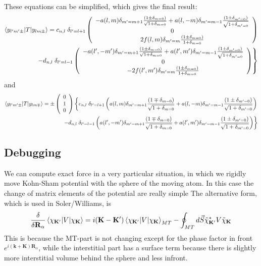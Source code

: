 \documentclass[aps,prb,floatfix,epsfig,singlecolumn,showpacs,preprintnumbers]{revtex4}
\newcommand{\vR}{{\mathbf{R}}}
\newcommand{\vk}{{\mathbf{k}}}
\newcommand{\vK}{{\mathbf{K}}}
\begin{document}
These equations can be simplified, which gives the final result:
\begin{eqnarray}
\braket{y_{l'm'\pm}|T|y_{lm\pm}}  =
c_{n,l}\;\delta_{l'=l+1}
\left(
\begin{array}{c}
-a(l,m)\delta_{m'=m+1}\frac{(1\pm\delta_{m=0})}{\sqrt{1+\delta_{m=0}}}
+a(l,-m)\delta_{m'=m-1}\frac{(1\pm\delta_{m'=0})}{\sqrt{1+\delta_{m'=0}}} \\
0\\
2 f(l,m)\delta_{m'=m} \frac{(1\pm\delta_{m=0})}{1+\delta_{m=0}}
\end{array}
\right)
%
\nonumber\\
\left.
%
-d_{n,l}\;\delta_{l'=l-1}
\left(
\begin{array}{c}
-a(l',-m')\delta_{m'=m+1}\frac{(1\pm\delta_{m=0})}{\sqrt{1+\delta_{m=0}}}+a(l',m')\delta_{m'=m-1}\frac{(1\pm\delta_{m'=0})}{\sqrt{1+\delta_{m'=0}}}\\
0\\
-2 f(l',m')\delta_{m'=m}\frac{(1\pm\delta_{m=0})}{1+\delta_{m=0}}
\end{array}
\right)
\right\}
\end{eqnarray}
and
\begin{eqnarray}
\braket{y_{l'm'\pm}|T|y_{lm\mp}}  =
\pm\left(
\begin{array}{c}
0\\
1\\
0
\end{array}
\right)
\left\{
c_{n,l}\;\delta_{l'=l+1}
\left(
  a(l,m)\delta_{m'=m+1}\frac{(1\mp\delta_{m=0})}{\sqrt{1+\delta_{m=0}}}+a(l,-m)\delta_{m'=m-1}\frac{(1\pm\delta_{m'=0})}{\sqrt{1+\delta_{m'=0}}}
\right)
\right.
%
\nonumber\\
%
\left.
-d_{n,l}\;\delta_{l'=l-1}
\left(
a(l',-m')\delta_{m'=m+1}\frac{(1\mp\delta_{m=0})}{\sqrt{1+\delta_{m=0}}}+a(l',m')\delta_{m'=m-1}\frac{(1\pm\delta_{m'=0})}{\sqrt{1+\delta_{m'=0}}}
\right)
\right\}
\end{eqnarray}

\subsection{Debugging}

We can compute exact force in a very particular situation, in which we
rigidly move Kohn-Sham potential with the sphere of the moving
atom. In this case the change of matrix elements of the potential are
really simple
The alternative form, which is used in Soler/Williams, is
\begin{eqnarray}
\frac{\delta}{\delta \vR_\alpha} \braket{\chi_{\vK'}|V|\chi_{\vK}} = 
i(\vK-\vK')\braket{\chi_{\vK'}|V|\chi_\vK}_{MT} 
-\oint_{MT} d\vec{S} \tilde{\chi}_{\vK'}^* V  \tilde{\chi}_{\vK}
\end{eqnarray}
This is because the MT-part is not changing except for the phase
factor in front $e^{i(\vk+\vK)\vR_\alpha}$, while the interstitial
part has a surface term because there is slightly more interstitial
volume behind the sphere and less infront.
\end{document}
